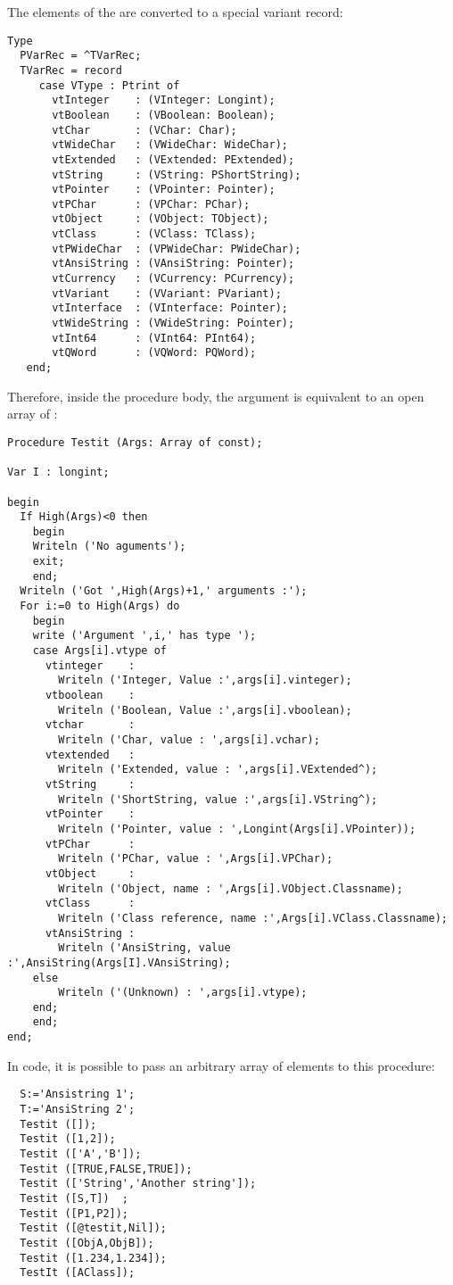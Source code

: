 The elements of the  are converted to a special variant record:
\begin{verbatim}
Type
  PVarRec = ^TVarRec;
  TVarRec = record
     case VType : Ptrint of
       vtInteger    : (VInteger: Longint);
       vtBoolean    : (VBoolean: Boolean);
       vtChar       : (VChar: Char);
       vtWideChar   : (VWideChar: WideChar);
       vtExtended   : (VExtended: PExtended);
       vtString     : (VString: PShortString);
       vtPointer    : (VPointer: Pointer);
       vtPChar      : (VPChar: PChar);
       vtObject     : (VObject: TObject);
       vtClass      : (VClass: TClass);
       vtPWideChar  : (VPWideChar: PWideChar);
       vtAnsiString : (VAnsiString: Pointer);
       vtCurrency   : (VCurrency: PCurrency);
       vtVariant    : (VVariant: PVariant);
       vtInterface  : (VInterface: Pointer);
       vtWideString : (VWideString: Pointer);
       vtInt64      : (VInt64: PInt64);
       vtQWord      : (VQWord: PQWord);
   end;
\end{verbatim}
Therefore, inside the procedure body, the  argument is equivalent to
an open array of :
\begin{verbatim}
Procedure Testit (Args: Array of const);

Var I : longint;

begin
  If High(Args)<0 then
    begin
    Writeln ('No aguments');
    exit;
    end;
  Writeln ('Got ',High(Args)+1,' arguments :');
  For i:=0 to High(Args) do
    begin
    write ('Argument ',i,' has type ');
    case Args[i].vtype of
      vtinteger    :
        Writeln ('Integer, Value :',args[i].vinteger);
      vtboolean    :
        Writeln ('Boolean, Value :',args[i].vboolean);
      vtchar       :
        Writeln ('Char, value : ',args[i].vchar);
      vtextended   :
        Writeln ('Extended, value : ',args[i].VExtended^);
      vtString     :
        Writeln ('ShortString, value :',args[i].VString^);
      vtPointer    :
        Writeln ('Pointer, value : ',Longint(Args[i].VPointer));
      vtPChar      :
        Writeln ('PChar, value : ',Args[i].VPChar);
      vtObject     :
        Writeln ('Object, name : ',Args[i].VObject.Classname);
      vtClass      :
        Writeln ('Class reference, name :',Args[i].VClass.Classname);
      vtAnsiString :
        Writeln ('AnsiString, value :',AnsiString(Args[I].VAnsiString);
    else
        Writeln ('(Unknown) : ',args[i].vtype);
    end;
    end;
end;
\end{verbatim}
In code, it is possible to pass an arbitrary array of elements
to this procedure:
\begin{verbatim}
  S:='Ansistring 1';
  T:='AnsiString 2';
  Testit ([]);
  Testit ([1,2]);
  Testit (['A','B']);
  Testit ([TRUE,FALSE,TRUE]);
  Testit (['String','Another string']);
  Testit ([S,T])  ;
  Testit ([P1,P2]);
  Testit ([@testit,Nil]);
  Testit ([ObjA,ObjB]);
  Testit ([1.234,1.234]);
  TestIt ([AClass]);
\end{verbatim}

